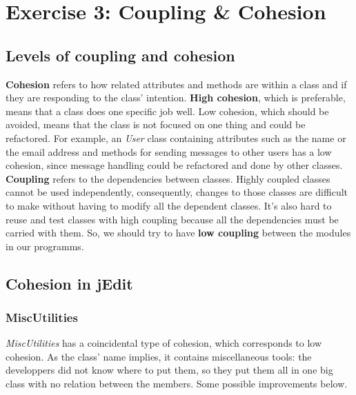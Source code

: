 \section{Exercise 3: Coupling \& Cohesion}

\subsection{Levels of coupling and cohesion}

\textbf{Cohesion} refers to how related attributes and methods are
within a class and if they are responding to the class' intention.
\textbf{High cohesion}, which is preferable, means that a class does one
specific job well. Low cohesion, which should be avoided, means that the
class is not focused on one thing and could be refactored. For example,
an \emph{User} class containing attributes such as the name or the email
address and methods for sending messages to other users has a low
cohesion, since message handling could be refactored and done by other
classes.\\

\textbf{Coupling} refers to the dependencies between classes. Highly
coupled classes cannot be used independently, consequently, changes to
those classes are difficult to make without having to modify all the
dependent classes. It's also hard to reuse and test classes with high
coupling because all the dependencies must be carried with them. So, we
should try to have \textbf{low coupling} between the modules in our
programms.

\subsection{Cohesion in jEdit}

\subsubsection{MiscUtilities}

\emph{MiscUtilities} has a coincidental type of cohesion, which
corresponds to low cohesion. As the class' name implies, it contains
miscellaneous tools: the developpers did not know where to put them, so
they put them all in one big class with no relation between the members.
Some possible improvements below.

